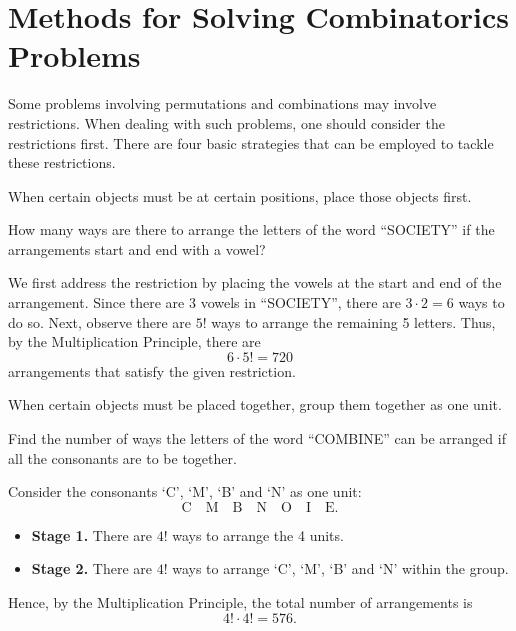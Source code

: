 \section{Methods for Solving Combinatorics Problems}

Some problems involving permutations and combinations may involve restrictions. When dealing with such problems, one should consider the restrictions first. There are four basic strategies that can be employed to tackle these restrictions.

\begin{recipe}
    When certain objects must be at certain positions, place those objects first.
\end{recipe}

\begin{sample}
    How many ways are there to arrange the letters of the word ``SOCIETY'' if the arrangements start and end with a vowel?
\end{sample}
\begin{sampans}
    We first address the restriction by placing the vowels at the start and end of the arrangement. Since there are 3 vowels in ``SOCIETY'', there are $3 \cdot 2 = 6$ ways to do so. Next, observe there are $5!$ ways to arrange the remaining 5 letters. Thus, by the Multiplication Principle, there are \[6 \cdot 5! = 720\] arrangements that satisfy the given restriction.
\end{sampans}

\begin{recipe}
    When certain objects must be placed together, group them together as one unit.
\end{recipe}

\begin{sample}
    Find the number of ways the letters of the word ``COMBINE'' can be arranged if all the consonants are to be together.
\end{sample}
\begin{sampans}
    Consider the consonants `C', `M', `B' and `N' as one unit: \[\boxed{\text{C} \quad \text{M} \quad \text{B} \quad \text{N}} \quad \boxed{\text{O}} \quad \boxed{\text{I}} \quad \boxed{\text{E}}.\]
    \begin{itemize}
        \item \textbf{Stage 1.} There are $4!$ ways to arrange the 4 units.
        \item \textbf{Stage 2.} There are $4!$ ways to arrange `C', `M', `B' and `N' within the group.
    \end{itemize}
    Hence, by the Multiplication Principle, the total number of arrangements is \[4! \cdot 4! = 576.\]
\end{sampans}

